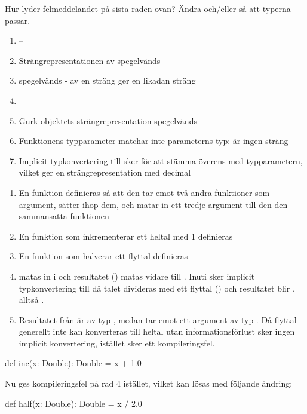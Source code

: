 \Subtask Hur lyder felmeddelandet på sista raden ovan? Ändra  och/eller  så att typerna passar.

\SOLUTION

\TaskSolved \what

\SubtaskSolved   \begin{enumerate}
\item --
\item Strängrepresentationen av  spegelvänds
\item {} spegelvänds -  av en sträng ger en likadan sträng
\item --
\item Gurk-objektets strängrepresentation spegelvänds
\item Funktionens typparameter matchar inte parameterns typ:  är ingen sträng
\item Implicit typkonvertering till  sker för att stämma överens med typparametern, vilket ger en strängrepresentation med decimal
\end{enumerate}

\SubtaskSolved   \begin{enumerate}
\item En funktion definieras så att den tar emot två andra funktioner som argument, sätter ihop dem, och matar in ett tredje argument till den den sammansatta funktionen
\item En funktion som inkrementerar ett heltal med 1 definieras
\item En funktion som halverar ett flyttal definieras
\item {} matas in i  och resultatet () matas vidare till . Inuti  sker implicit typkonvertering till  då talet divideras med ett flyttal () och resultatet blir , alltså .
\item Resultatet från  är av typ , medan  tar emot ett argument av typ . Då flyttal generellt inte kan konverteras till heltal utan informationsförlust sker ingen implicit konvertering, istället sker ett kompileringsfel.
\end{enumerate}

\SubtaskSolved  \begin{Code}
def inc(x: Double): Double = x + 1.0
\end{Code}
Nu ges kompileringsfel på rad 4 istället, vilket kan lösas med följande ändring:
\begin{Code}
def half(x: Double): Double = x / 2.0
\end{Code}


